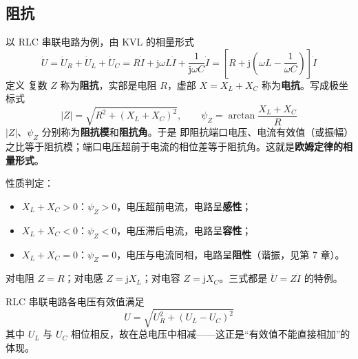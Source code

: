 \subsection{阻抗}
以 RLC 串联电路为例，由 KVL 的相量形式
\begin{equation}
\dot{U}=\dot{U}_R+\dot{U}_L+\dot{U}_C
=R\dot{I}+\mathrm{j}\omega L\dot{I}+\frac{1}{\mathrm{j}\omega C}\dot{I}
=\left[R+\mathrm{j}\left(\omega L-\frac{1}{\omega C}\right)\right]\dot{I}
\end{equation}
定义
复数 $Z$ 称为\textbf{阻抗}，实部是电阻 $R$，虚部 $X=X_L+X_C$ 称为\textbf{电抗}。写成极坐标式
\begin{equation}
|Z|=\sqrt{R^2+\left(X_L+X_C\right)^2},\qquad
\psi_Z=\arctan\frac{X_L+X_C}{R}
\end{equation}
$|Z|$、$\psi_Z$ 分别称为\textbf{阻抗模}和\textbf{阻抗角}。于是
即阻抗端口电压、电流有效值（或振幅）之比等于阻抗模；端口电压超前于电流的相位差等于阻抗角。这就是\textbf{欧姆定律的相量形式}。

性质判定：
\begin{itemize}
  \item $X_L+X_C>0$：$\psi_Z>0$，电压超前电流，电路呈\textbf{感性}；
  \item $X_L+X_C<0$：$\psi_Z<0$，电压滞后电流，电路呈\textbf{容性}；
  \item $X_L+X_C=0$：$\psi_Z=0$，电压与电流同相，电路呈\textbf{阻性}（谐振，见第 7 章）。
\end{itemize}
对电阻 $Z=R$；对电感 $Z=\mathrm{j}X_L$；对电容 $Z=\mathrm{j}X_C$。三式都是 $\dot{U}=Z\dot{I}$ 的特例。

RLC 串联电路各电压有效值满足
\begin{equation}
U=\sqrt{U_R^2+\left(U_L-U_C\right)^2}
\end{equation}
其中 $U_L$ 与 $U_C$ 相位相反，故在总电压中相减——这正是“有效值不能直接相加”的体现。

